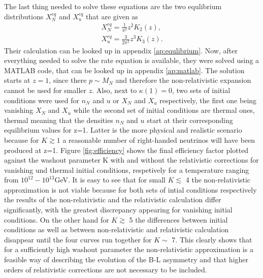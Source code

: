 The last thing needed to solve these equations are the two equlibrium distributions $X_N^{eq}$ and $X_u^{eq}$ that are given as
\begin{align}
	X_N^{eq}=\frac{1}{\pi^2}z^2K_2(z),\\
	X_u^{eq}=\frac{3}{2\pi^2}z^3K_3(z).
\end{align}
Their calculation can be looked up in appendix \ref{ap:equlibrium}.\newline \indent
Now, after everything needed to solve the rate equation is available, they were solved using a MATLAB code, that can be looked up in appendix \ref{ap:matlab}. The solution starts at $z=1$, since there $p\sim M_N$ and therefore the non-relativistic expansion cannot be used for smaller $z$\cite[p. 13]{Bodeker:2013qaa}. Also, next to $\kappa(1)=0$, two sets of initial conditions were used for $n_N$ and $u$ or $X_N$ and $X_u$ respectively, the first one being vanishing $X_N$ and $X_u$ while the second set of initial conditions are thermal ones, thermal meaning that the densities $n_N$ and $u$ start at their corresponding equilibrium values for z=1. Latter is the more physical and realistic scenario because for $K\gtrsim1$ a reasonable number of right-handed neutrinos will have been produced at z=1\cite[p. 13]{Bodeker:2013qaa}. \newline\indent
Figure \ref{fig:efficiency} shows the final efficiency factor plotted against the washout parameter K with and without the relativistic corrections for vanishing und thermal initial conditions, respetively for a temperature ranging from $10^{12}-10^{13}$GeV. It is easy to see that for small $K\lesssim$ 4 the non-relativistic approximation is not viable because for both sets of intial conditions respectively the results of the non-relativistic and the relativistic calculation differ significantly, with the greatest discrepancy appearing for vanishing initial conditions. On the other hand for $K\gtrsim$ 5 the differences between initial conditions as well as between non-relativistic and relativistic calculation disappear until the four curves run together for $K\sim$ 7. This clearly shows that for a sufficiently high washout parameter the non-relativistic approximation is a feasible way of describing the evolution of the B-L asymmetry and that higher orders of relativistic corrections are not necessary to be included.
